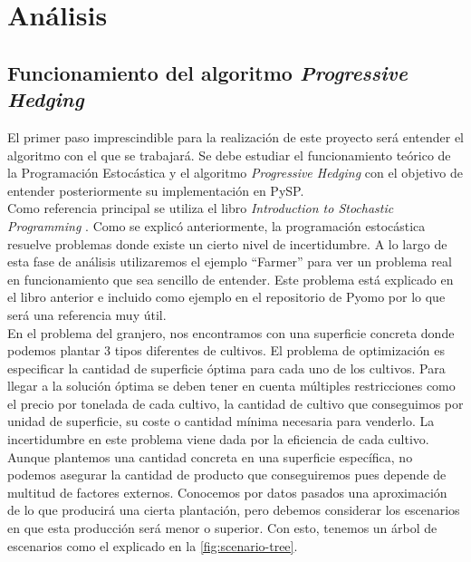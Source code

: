\chapter{Análisis}
\label{ch:analisis}

\section{Funcionamiento del algoritmo \textit{Progressive Hedging}}


El primer paso imprescindible para la realización de este proyecto será entender el algoritmo con el que se trabajará. Se debe estudiar el funcionamiento teórico de la Programación Estocástica y el algoritmo \textit{Progressive Hedging} con el objetivo de entender posteriormente su implementación en PySP. \\

Como referencia principal se utiliza el libro {\it Introduction to Stochastic Programming} \cite{stochasticProgramming}. Como se explicó anteriormente, la programación estocástica resuelve problemas donde existe un cierto nivel de incertidumbre. A lo largo de esta fase de análisis utilizaremos el ejemplo ``Farmer'' para ver un problema real en funcionamiento que sea sencillo de entender. Este problema está explicado en el libro anterior e incluido como ejemplo en el repositorio de Pyomo por lo que será una referencia muy útil.\\

En el problema del granjero, nos encontramos con una superficie concreta donde podemos plantar 3 tipos diferentes de cultivos. El problema de optimización es especificar la cantidad de superficie óptima para cada uno de los cultivos. Para llegar a la solución óptima se deben tener en cuenta múltiples restricciones como el precio por tonelada de cada cultivo, la cantidad de cultivo que conseguimos por unidad de superficie, su coste o cantidad mínima necesaria para venderlo. La incertidumbre en este problema viene dada por la eficiencia de cada cultivo. Aunque plantemos una cantidad concreta en una superficie específica, no podemos asegurar la cantidad de producto que conseguiremos pues depende de multitud de factores externos. Conocemos por datos pasados una aproximación de lo que producirá una cierta plantación, pero debemos considerar los escenarios en que esta producción será menor o superior. Con esto, tenemos un árbol de escenarios como el explicado en la \autoref{fig:scenario-tree}.\\

